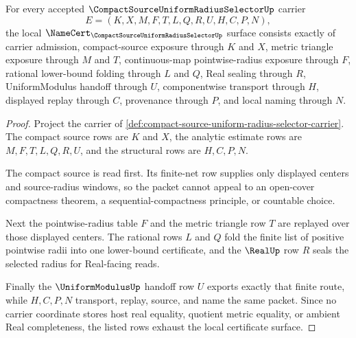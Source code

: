 \begin{theorem}
\label{thm:compact-source-uniform-radius-selector-namecert-obligations}
For every accepted $\CompactSourceUniformRadiusSelectorUp$ carrier
$$
E=(K,X,M,F,T,L,Q,R,U,H,C,P,N),
$$
the local $\NameCert_{\CompactSourceUniformRadiusSelectorUp}$ surface consists exactly of carrier admission, compact-source exposure through $K$ and $X$, metric triangle exposure through $M$ and $T$, continuous-map pointwise-radius exposure through $F$, rational lower-bound folding through $L$ and $Q$, Real sealing through $R$, UniformModulus handoff through $U$, componentwise transport through $H$, displayed replay through $C$, provenance through $P$, and local naming through $N$.
\end{theorem}
\begin{proof}
Project the carrier of \autoref{def:compact-source-uniform-radius-selector-carrier}. The compact source rows are $K$ and $X$, the analytic estimate rows are $M,F,T,L,Q,R,U$, and the structural rows are $H,C,P,N$.

The compact source is read first. Its finite-net row supplies only displayed centers and source-radius windows, so the packet cannot appeal to an open-cover compactness theorem, a sequential-compactness principle, or countable choice.

Next the pointwise-radius table $F$ and the metric triangle row $T$ are replayed over those displayed centers. The rational rows $L$ and $Q$ fold the finite list of positive pointwise radii into one lower-bound certificate, and the $\RealUp$ row $R$ seals the selected radius for Real-facing reads.

Finally the $\UniformModulusUp$ handoff row $U$ exports exactly that finite route, while $H,C,P,N$ transport, replay, source, and name the same packet. Since no carrier coordinate stores host real equality, quotient metric equality, or ambient Real completeness, the listed rows exhaust the local certificate surface.
\end{proof}

